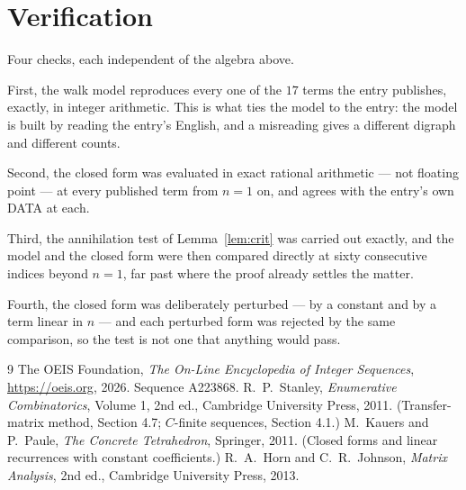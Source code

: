\documentclass[11pt,a4paper]{article}
\theoremstyle{plain}
\theoremstyle{definition}
\begin{document}
\section{Verification}

Four checks, each independent of the algebra above.

First, the walk model reproduces every one of the $17$ terms the entry publishes,
exactly, in integer arithmetic. This is what ties the model to the entry: the model is built
by reading the entry's English, and a misreading gives a different digraph and different
counts.

Second, the closed form was evaluated in exact rational arithmetic --- not floating point ---
at every published term from $n=1$ on, and agrees with the entry's own DATA at each.

Third, the annihilation test of Lemma~\ref{lem:crit} was carried out exactly, and the model
and the closed form were then compared directly at sixty consecutive indices beyond
$n=1$, far past where the proof already settles the matter.

Fourth, the closed form was deliberately perturbed --- by a constant and by a term linear in
$n$ --- and each perturbed form was rejected by the same comparison, so the test is not one
that anything would pass.

\begin{thebibliography}{9}
 The OEIS Foundation, \emph{The On-Line Encyclopedia of Integer
Sequences}, \url{https://oeis.org}, 2026. Sequence A223868.
 R.~P.~Stanley, \emph{Enumerative Combinatorics}, Volume 1, 2nd ed.,
Cambridge University Press, 2011. (Transfer-matrix method, Section 4.7; $C$-finite sequences,
Section 4.1.)
 M.~Kauers and P.~Paule, \emph{The Concrete Tetrahedron}, Springer, 2011.
(Closed forms and linear recurrences with constant coefficients.)
 R.~A.~Horn and C.~R.~Johnson, \emph{Matrix Analysis}, 2nd ed., Cambridge
University Press, 2013.
\end{thebibliography}
\end{document}
